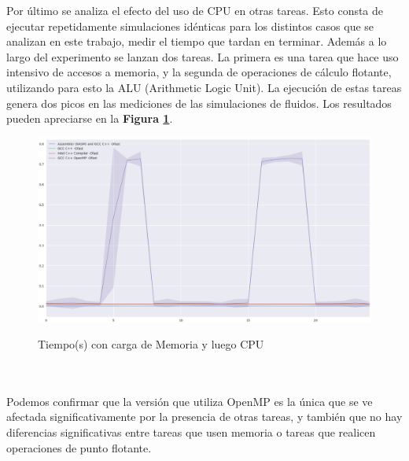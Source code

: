 Por último se analiza el efecto del uso de CPU en otras tareas. Esto consta de ejecutar repetidamente simulaciones idénticas para los distintos casos que se analizan en este trabajo, medir el tiempo que tardan en terminar. Además a lo largo del experimento se lanzan dos tareas. La primera es una tarea que hace uso intensivo de accesos a memoria, y la segunda de operaciones de cálculo flotante, utilizando para esto la ALU (Arithmetic Logic Unit). La ejecución de estas tareas genera dos picos en las mediciones de  las simulaciones de fluidos. Los resultados pueden apreciarse en la \textbf{Figura \ref{fig:plot_stress_test_ram_cpu}}. 
\begin{figure}[!htbp]
\caption{Tiempo(s) con carga de Memoria y luego CPU}
\includegraphics[width=\textwidth]{imagenes/plot_stress_test_ram_cpu.png}
\label{fig:plot_stress_test_ram_cpu}
\end{figure}
~\\
~\\
Podemos confirmar que la versión que utiliza OpenMP es la única que se ve afectada significativamente por la presencia de otras tareas, y también que no hay diferencias significativas entre tareas que usen memoria o tareas que realicen operaciones de punto flotante.




